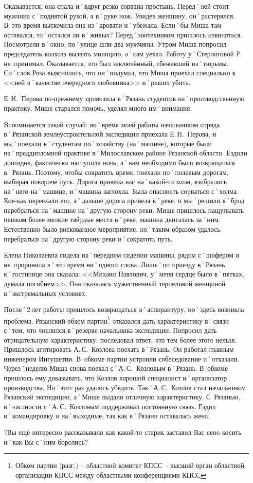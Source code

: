 Оказывается, она спала и˚вдруг резко сорвана простынь. Перед˚ней стоит мужчина с˚поднятой рукой, а в˚руке нож. Увидев женщину, он˚растерялся. В~это время выскочила она из˚кровати и˚убежала. Если˚бы Миша там оставался, то˚остался ли в˚живых? Перед˚зоотехником пришлось извиняться. Посмотрели в˚окно, по˚улице шли два мужчины. Утром Миша попросил председатель колхоза вызвать милицию, а˚сам уехал. Работу у˚Стерлиговой Р. не~принимал. Оказывается, это был заключённый, сбежавший из˚тюрьмы. Со˚слов Роза выяснилось, что он˚подумал, что Миша приехал специально к <<ней в˚качестве очередного любовника>> и˚решил убить.

Е.\,Н.~Перова по-прежнему привозила в˚Рязань студентов на˚производственную практику. Мише старался помочь, уделял много им˚внимания.

Вспоминается такой случай: во˚время моей работы начальником отряда в˚Рязанской землеустроительной экспедиции приехала Е.\,Н.~Перова, и мы˚поехали к˚студентам по˚хозяйству (на˚машине), которые были на˚преддипломной практике в˚Милославском районе Рязанской области. Ездили допоздна, фактически наступила ночь, а˚нам необходимо было возвращаться в˚Рязань. Поэтому, чтобы сократить время, поехали по˚полевым дорогам, выбирая покороче путь. Дорога привела нас на˚какой-то холм, взобрались на˚него на˚машине, и˚машина заглохла. Была опасность сорваться с˚холма. Кое-как переехали его, а˚дальше дорога привела к˚реке, и мы˚решили в˚брод перебраться на˚машине на˚другую сторону реки. Мише пришлось нащупывать пешком более мелкие твёрдые места в˚реке, машина двигалась за˚ним. Естественно было рискованное мероприятие, но˚таким образом удалось перебраться на˚другую сторону реки и˚сократить путь. 

Елена Николаевна сидела на˚переднем сидении машины, рядом с˚шофёром и не~проронила в˚это время ни˚одного слова. Лишь˚по приезду в˚Рязань к˚гостинице она сказала: <<Михаил Павлович, у˚меня сердце было в˚пятках, думала погибнем>>. Она оказалась мужественный терпеливой женщиной в˚экстремальных условиях.

После˚2\,лет работы пришлось возвращаться в˚аспирантуру, но˚здесь возникла проблема. Рязанский обком партии\footnote{Обком партии (разг.) \--- областной комитет КПСС \--- высший орган областной организации КПСС между областными конференциями КПСС} отказался дать характеристику в˚связи с˚тем, что числился в˚резерве начальника экспедиции. Попросил дать отрицательную характеристику. последовал ответ, что тем более этого нельзя. Пришлось агитировать А.\,С.~Козлова поехать в˚Рязань. Он работал главным инженером Ингушетии. В~обкоме партии устроили собеседование и˚отказали. Через˚неделю Миша снова поехал с˚А.\,С.~Козловым в˚Рязань. В~обкоме пришлось ему доказывать, что Козлов хороший специалист и˚организатор производства. Но˚этот раз удалось убедить. Так˚А.\,С.~Козлов стал начальником Рязанский экспедиции, а˚Мише выдали отличную характеристику. С~Рязанью, в˚частности с˚А.\,С.~Козловым поддерживал постоянную связь. Ездил в˚командировку и на˚выходные, так как в˚Рязани оставалась жена.

?Вы ещё интересно рассказывали как какой-то старик заставил Вас сено косить и˚как Вы с˚ним боролись?